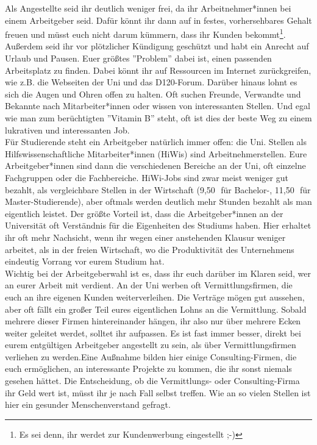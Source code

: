 {	Als Angestellte seid ihr deutlich weniger frei, da ihr Arbeitnehmer*innen bei einem Arbeitgeber seid. Dafür könnt ihr dann auf in festes, vorhersehbares Gehalt freuen und müsst euch nicht darum kümmern, dass ihr Kunden bekommt\footnote{Es sei denn, ihr werdet zur Kundenwerbung eingestellt ;-)}. Außerdem seid ihr vor plötzlicher Kündigung geschützt und habt ein Anrecht auf Urlaub und Pausen. Euer größtes ''Problem'' dabei ist, einen passenden Arbeitsplatz zu finden. Dabei könnt ihr auf Ressourcen im Internet zurückgreifen, wie z.B. die Webseiten der Uni und das D120-Forum. Darüber hinaus lohnt es sich die Augen und Ohren offen zu halten. Oft suchen Freunde, Verwandte und Bekannte nach Mitarbeiter*innen oder wissen von interessanten Stellen. Und egal wie man zum berüchtigten ''Vitamin B'' steht, oft ist dies der beste Weg zu einem lukrativen und interessanten Job. \\
	
	Für Studierende steht ein Arbeitgeber natürlich immer offen: die Uni.
    Stellen als Hilfswissenschaftliche Mitarbeiter*innen (HiWis) sind
    Arbeitnehmerstellen. Eure Arbeitgeber*innen sind dann die verschiedenen
    Bereiche an der Uni, oft einzelne Fachgruppen oder die Fachbereiche.
    HiWi-Jobs sind zwar meist weniger gut bezahlt, als vergleichbare Stellen in
    der Wirtschaft (9,50\,\EURtm ~für Bachelor-, 11,50\,\EURtm ~für Master-Studierende), aber oftmals werden deutlich mehr Stunden bezahlt als man eigentlich leistet. Der größte Vorteil ist, dass die Arbeitgeber*innen an der Universität oft Verständnis für die Eigenheiten des Studiums haben. Hier erhaltet ihr oft mehr Nachsicht, wenn ihr wegen einer anstehenden Klausur weniger arbeitet, als in der freien Wirtschaft, wo die Produktivität des Unternehmens eindeutig Vorrang vor eurem Studium hat. \\
	
	Wichtig bei der Arbeitgeberwahl ist es, dass ihr euch darüber im Klaren seid, wer an eurer Arbeit mit verdient. An der Uni werben oft Vermittlungsfirmen, die euch an ihre eigenen Kunden weiterverleihen. Die Verträge mögen gut aussehen, aber oft fällt ein großer Teil eures eigentlichen Lohns an die Vermittlung. Sobald mehrere dieser Firmen hintereinander hängen, ihr also nur über mehrere Ecken weiter geleitet werdet, solltet ihr aufpassen. Es ist fast immer besser, direkt bei eurem entgültigen Arbeitgeber angestellt zu sein, als über Vermittlungsfirmen verliehen zu werden.Eine Außnahme bilden hier einige Consulting-Firmen, die euch ermöglichen, an interessante Projekte zu kommen, die ihr sonst niemals gesehen hättet. Die Entscheidung, ob die Vermittlungs- oder Consulting-Firma ihr Geld wert ist, müsst ihr je nach Fall selbst treffen. Wie an so vielen Stellen ist hier ein gesunder Menschenverstand gefragt. \\
	
}

